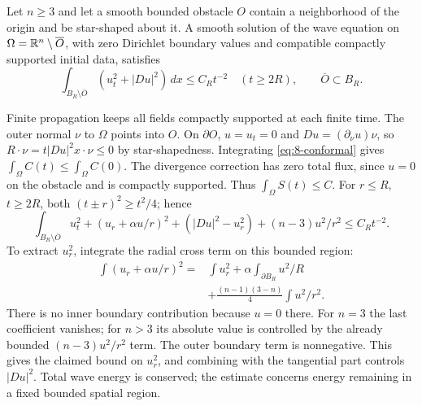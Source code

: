 \Needspace{55mm}
\begin{theorem}
Let $n\geq3$ and let a smooth bounded obstacle $O$ contain a neighborhood
of the origin and be star-shaped about it. A smooth solution of the wave
equation on $\Omega=\mathbb{R}^n\setminus\overline O$, with zero Dirichlet
boundary values and compatible compactly supported initial data, satisfies
\[
 \int_{B_R\setminus\overline O}(u_t^2+|Du|^2)\,dx
 \leq C_R t^{-2}\quad(t\geq2R),\qquad\overline O\subset B_R.
\]
\end{theorem}
\begin{expandedproof}
Finite propagation keeps all fields compactly supported at each finite time.
The outer normal $\nu$ to $\Omega$ points into $O$.
On $\partial O$, $u=u_t=0$ and $Du=(\partial_\nu u)\nu$, so
$R\cdot\nu=t|Du|^2x\cdot\nu\leq0$ by star-shapedness.
Integrating \eqref{eq:8-conformal} gives
$\int_\Omega C(t)\leq\int_\Omega C(0)$.
The divergence correction has zero total flux, since $u=0$ on the
obstacle and is compactly supported. Thus $\int_\Omega S(t)\leq C$.
For $r\leq R$, $t\geq2R$, both $(t\pm r)^2\geq t^2/4$; hence
\[
 \int_{B_R\setminus\overline O}
 u_t^2+(u_r+\alpha u/r)^2+(|Du|^2-u_r^2)
                 +(n-3)u^2/r^2\leq C_Rt^{-2}.
\]
To extract $u_r^2$, integrate the radial cross term on this bounded region:
\[
 \begin{split}
 \int(u_r+\alpha u/r)^2
 ={}&\int u_r^2+\alpha\int_{\partial B_R}u^2/R\\
 &+\frac{(n-1)(3-n)}4\int u^2/r^2.
 \end{split}
\]
There is no inner boundary contribution because $u=0$ there.
For $n=3$ the last coefficient vanishes; for $n>3$ its absolute value
is controlled by the already bounded $(n-3)u^2/r^2$ term.
The outer boundary term is nonnegative. This gives the claimed bound
on $u_r^2$, and combining with the tangential part controls $|Du|^2$.
Total wave energy is conserved; the estimate concerns energy remaining
in a fixed bounded spatial region.
\end{expandedproof}
